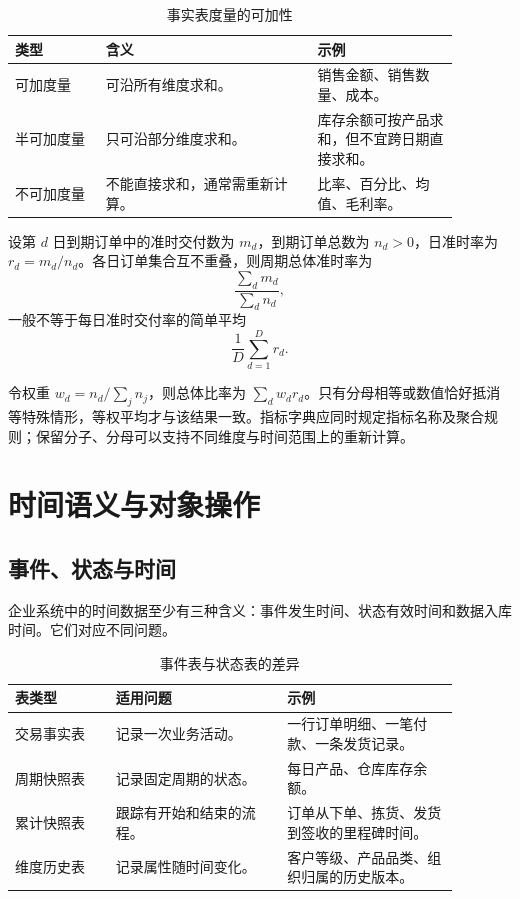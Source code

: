 \begin{table}[htbp]
\centering
\caption{事实表度量的可加性}
\begin{tabular}{P{0.18\linewidth}P{0.42\linewidth}P{0.28\linewidth}}
\toprule
{}
类型 & 含义 & 示例\\
\midrule
可加度量 & 可沿所有维度求和。 & 销售金额、销售数量、成本。\\
半可加度量 & 只可沿部分维度求和。 & 库存余额可按产品求和，但不宜跨日期直接求和。\\
不可加度量 & 不能直接求和，通常需重新计算。 & 比率、百分比、均值、毛利率。\\
\bottomrule
\end{tabular}
\end{table}

\begin{proposition}[比率指标的加权汇总]
设第 \(d\) 日到期订单中的准时交付数为 \(m_d\)，到期订单总数为 \(n_d>0\)，日准时率为 \(r_d=m_d/n_d\)。各日订单集合互不重叠，则周期总体准时率为
\[
\frac{\sum_d m_d}{\sum_d n_d},
\]
一般不等于每日准时交付率的简单平均
\[
\frac{1}{D}\sum_{d=1}^{D}r_d.
\]
\end{proposition}

令权重 \(w_d=n_d/\sum_j n_j\)，则总体比率为 \(\sum_d w_dr_d\)。只有分母相等或数值恰好抵消等特殊情形，等权平均才与该结果一致。指标字典应同时规定指标名称及聚合规则；保留分子、分母可以支持不同维度与时间范围上的重新计算。

\section{时间语义与对象操作}
\subsection{事件、状态与时间}

企业系统中的时间数据至少有三种含义：事件发生时间、状态有效时间和数据入库时间。它们对应不同问题。

\begin{table}[htbp]
\centering
\caption{事件表与状态表的差异}
\begin{tabular}{P{0.20\linewidth}P{0.34\linewidth}P{0.34\linewidth}}
\toprule
{}
表类型 & 适用问题 & 示例\\
\midrule

交易事实表 & 记录一次业务活动。 & 一行订单明细、一笔付款、一条发货记录。\\
周期快照表 & 记录固定周期的状态。 & 每日产品、仓库库存余额。\\
累计快照表 & 跟踪有开始和结束的流程。 & 订单从下单、拣货、发货到签收的里程碑时间。\\
维度历史表 & 记录属性随时间变化。 & 客户等级、产品品类、组织归属的历史版本。\\
\bottomrule
\end{tabular}
\end{table}

